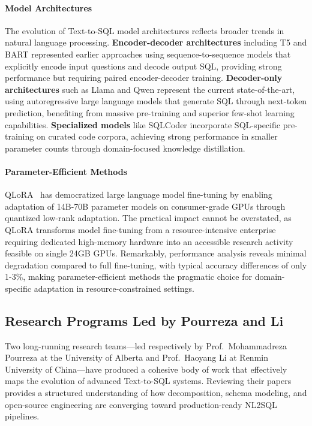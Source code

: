 \paragraph{Model Architectures}

The evolution of Text-to-SQL model architectures reflects broader trends in natural language processing. \textbf{Encoder-decoder architectures} including T5 and BART represented earlier approaches using sequence-to-sequence models that explicitly encode input questions and decode output SQL, providing strong performance but requiring paired encoder-decoder training. \textbf{Decoder-only architectures} such as Llama and Qwen represent the current state-of-the-art, using autoregressive large language models that generate SQL through next-token prediction, benefiting from massive pre-training and superior few-shot learning capabilities. \textbf{Specialized models} like SQLCoder incorporate SQL-specific pre-training on curated code corpora, achieving strong performance in smaller parameter counts through domain-focused knowledge distillation.

\paragraph{Parameter-Efficient Methods}

QLoRA~\cite{dettmers2023qlora} has democratized large language model fine-tuning by enabling adaptation of 14B-70B parameter models on consumer-grade GPUs through quantized low-rank adaptation. The practical impact cannot be overstated, as QLoRA transforms model fine-tuning from a resource-intensive enterprise requiring dedicated high-memory hardware into an accessible research activity feasible on single 24GB GPUs. Remarkably, performance analysis reveals minimal degradation compared to full fine-tuning, with typical accuracy differences of only 1-3\%, making parameter-efficient methods the pragmatic choice for domain-specific adaptation in resource-constrained settings.

\subsection{Research Programs Led by Pourreza and Li}

Two long-running research teams---led respectively by Prof.~Mohammadreza Pourreza at the University of Alberta and Prof.~Haoyang Li at Renmin University of China---have produced a cohesive body of work that effectively maps the evolution of advanced Text-to-SQL systems. Reviewing their papers provides a structured understanding of how decomposition, schema modeling, and open-source engineering are converging toward production-ready NL2SQL pipelines.

